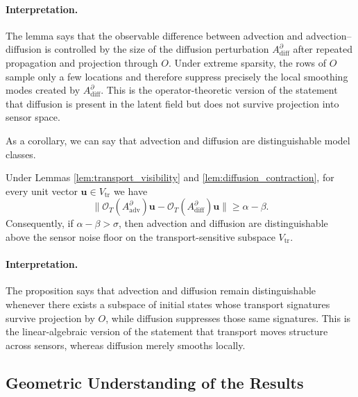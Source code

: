 \paragraph{Interpretation.}
The lemma says that the observable difference between advection and advection--diffusion is controlled by the size of the diffusion perturbation $A_{\mathrm{diff}}^{\partial}$ after repeated propagation and projection through $O$. Under extreme sparsity, the rows of $O$ sample only a few locations and therefore suppress precisely the local smoothing modes created by $A_{\mathrm{diff}}^{\partial}$. This is the operator-theoretic version of the statement that diffusion is present in the latent field but does not survive projection into sensor space.


As a corollary, we can say that advection and diffusion are distinguishable model classes.

\begin{corollary}
\label{prop:adv_diff_dist}
Under Lemmas \ref{lem:transport_visibility} and \ref{lem:diffusion_contraction}, for every unit vector $\mathbf{u}\in V_{\mathrm{tr}}$ we have
\begin{equation}
\|\mathcal{O}_T(A_{\mathrm{adv}}^{\partial})\mathbf{u}
-
\mathcal{O}_T(A_{\mathrm{diff}}^{\partial})\mathbf{u}\|
\ge
\alpha-\beta.
\label{eq:adv_diff_sep}
\end{equation}
Consequently, if $\alpha-\beta > \sigma$, then advection and diffusion are distinguishable above the sensor noise floor on the transport-sensitive subspace $V_{\mathrm{tr}}$.
\end{corollary}

\paragraph{Interpretation.}
The proposition says that advection and diffusion remain distinguishable whenever there exists a subspace of initial states whose transport signatures survive projection by $O$, while diffusion suppresses those same signatures. This is the linear-algebraic version of the statement that transport moves structure across sensors, whereas diffusion merely smooths locally.



\subsection{Geometric Understanding of the Results}

